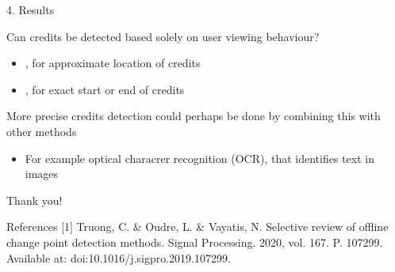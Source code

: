 \documentclass[first=orange,second=blue,logo=blueque]{aaltoslides}
\begin{document}
\begin{frame}{4. Results}
    \begin{block}{{\color{black}Can credits be detected based solely on user viewing behaviour?}}
        \begin{itemize}
            \item {\color{aaltoorange}{Yes}}, for approximate location of credits
            \item {\color{aaltoorange}{No}}, for exact start or end of credits
        \end{itemize}
        \vspace{0.5cm}
        More precise credits detection could perhaps be done by combining this with other methods
        \begin{itemize}
            \item For example optical characrer recognition (OCR), that identifies text in images
        \end{itemize}
    \end{block}
\end{frame}


\begin{frame}{Thank you!}
    \begin{block}{References}
        [1] Truong, C. \& Oudre, L. \& Vayatis, N. Selective review of offline change point detection methods. Signal Processing. 2020, vol. 167. P. 107299. Available at: doi:10.1016/j.sigpro.2019.107299.
    \end{block}
\end{frame}
\end{document}
